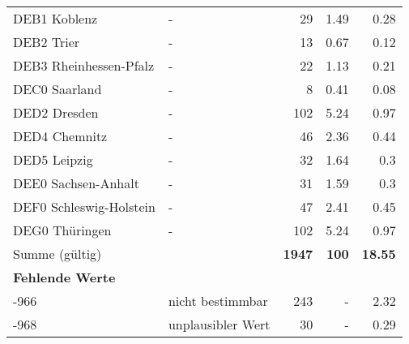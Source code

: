 \begin{longtable}{Xlrrr}
        \multicolumn{1}{X}{DEB1 Koblenz} & - & \num{29} & \num[round-mode=places,round-precision=2]{1.49} & \num[round-mode=places,round-precision=2]{0.28} \\
        \multicolumn{1}{X}{DEB2 Trier} & - & \num{13} & \num[round-mode=places,round-precision=2]{0.67} & \num[round-mode=places,round-precision=2]{0.12} \\
        \multicolumn{1}{X}{DEB3 Rheinhessen-Pfalz} & - & \num{22} & \num[round-mode=places,round-precision=2]{1.13} & \num[round-mode=places,round-precision=2]{0.21} \\
        \multicolumn{1}{X}{DEC0 Saarland} & - & \num{8} & \num[round-mode=places,round-precision=2]{0.41} & \num[round-mode=places,round-precision=2]{0.08} \\
        \multicolumn{1}{X}{DED2 Dresden} & - & \num{102} & \num[round-mode=places,round-precision=2]{5.24} & \num[round-mode=places,round-precision=2]{0.97} \\
        \multicolumn{1}{X}{DED4 Chemnitz} & - & \num{46} & \num[round-mode=places,round-precision=2]{2.36} & \num[round-mode=places,round-precision=2]{0.44} \\
        \multicolumn{1}{X}{DED5 Leipzig} & - & \num{32} & \num[round-mode=places,round-precision=2]{1.64} & \num[round-mode=places,round-precision=2]{0.3} \\
        \multicolumn{1}{X}{DEE0 Sachsen-Anhalt} & - & \num{31} & \num[round-mode=places,round-precision=2]{1.59} & \num[round-mode=places,round-precision=2]{0.3} \\
        \multicolumn{1}{X}{DEF0 Schleswig-Holstein} & - & \num{47} & \num[round-mode=places,round-precision=2]{2.41} & \num[round-mode=places,round-precision=2]{0.45} \\
        \multicolumn{1}{X}{DEG0 Thüringen} & - & \num{102} & \num[round-mode=places,round-precision=2]{5.24} & \num[round-mode=places,round-precision=2]{0.97} \\
     \midrule
      \multicolumn{2}{l}{Summe (gültig)} & \textbf{\num{1947}} &
      \textbf{\num{100}} &
         \textbf{\num[round-mode=places,round-precision=2]{18.55}} \\
     \multicolumn{5}{l}{\textbf{Fehlende Werte}}\\
       -966 & nicht bestimmbar & \num{243} & - & \num[round-mode=places,round-precision=2]{2.32} \\

       -968 & unplausibler Wert & \num{30} & - & \num[round-mode=places,round-precision=2]{0.29} \\


\end{longtable}
